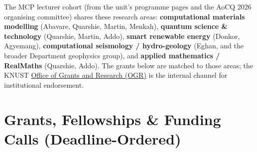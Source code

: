 \documentclass[11pt,a4paper]{article}
\begin{document}
The MCP lecturer cohort (from the unit's programme pages and the AoC\textbar Q 2026 organising committee) shares these research areas: \textbf{computational materials modelling} (Abavare, Quarshie, Martin, Menkah), \textbf{quantum science \& technology} (Quarshie, Martin, Addo), \textbf{smart renewable energy} (Donkor, Agyemang), \textbf{computational seismology / hydro-geology} (Eghan, and the broader Department geophysics group), and \textbf{applied mathematics / RealMaths} (Quarshie, Addo). The grants below are matched to those areas; the KNUST \href{https://ogr.knust.edu.gh/}{Office of Grants and Research (OGR)} is the internal channel for institutional endorsement.

\section{Grants, Fellowships \& Funding Calls (Deadline-Ordered)}
\end{document}
